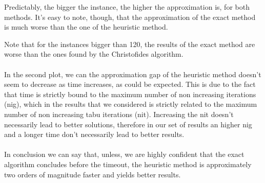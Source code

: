 \documentclass{article}
\begin{document}
Predictably, the bigger the instance, the higher the approximation is, for both methods.
It's easy to note, though, that the approximation of the exact method is much worse than the one of the heuristic method.

Note that for the instances bigger than 120, the results of the exact method are worse than the ones found by the Christofides algorithm.

\paragraph{}
In the second plot, we can the approximation gap of the heuristic method doesn't seem to decrease as time increases, as could be expected.
This is due to the fact that time is strictly bound to the maximum number of non increasing iterations (nig), which in the results that we considered is strictly related to the maximum number of non increasing tabu iterations (nit).
Increasing the nit doesn't necessarily lead to better solutions, therefore in our set of results an higher nig and a longer time don't necessarily lead to better results.

\paragraph{}
In conclusion we can say that, unless, we are highly confident that the exact algorithm concludes before the timeout, the heuristic method is approximately two orders of magnitude faster and yields better results.

\printbibliography
\end{document}
